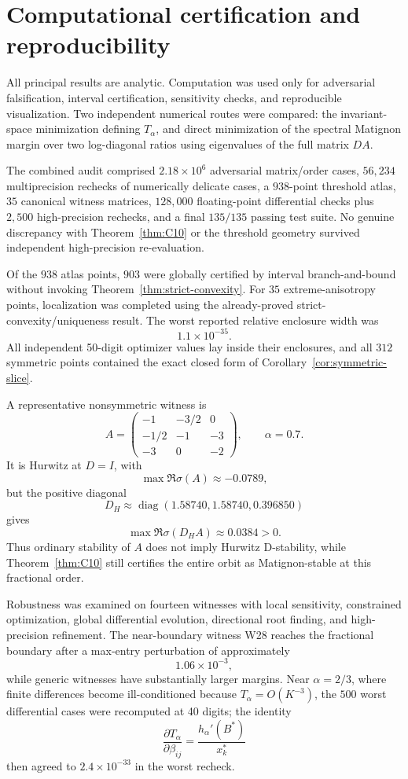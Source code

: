 \section{Computational certification and reproducibility}
\label{sec:computation}

All principal results are analytic. Computation was used only for adversarial falsification, interval certification, sensitivity checks, and reproducible visualization. Two independent numerical routes were compared: the invariant-space minimization defining \(T_\alpha\), and direct minimization of the spectral Matignon margin over two log-diagonal ratios using eigenvalues of the full matrix \(DA\).

The combined audit comprised \(2.18\times10^6\) adversarial matrix/order cases, \(56{,}234\) multiprecision rechecks of numerically delicate cases, a \(938\)-point threshold atlas, \(35\) canonical witness matrices, \(128{,}000\) floating-point differential checks plus \(2{,}500\) high-precision rechecks, and a final \(135/135\) passing test suite. No genuine discrepancy with Theorem~\ref{thm:C10} or the threshold geometry survived independent high-precision re-evaluation.

Of the \(938\) atlas points, \(903\) were globally certified by interval branch-and-bound without invoking Theorem~\ref{thm:strict-convexity}. For \(35\) extreme-anisotropy points, localization was completed using the already-proved strict-convexity/uniqueness result. The worst reported relative enclosure width was
\[
1.1\times10^{-35}.
\]
All independent 50-digit optimizer values lay inside their enclosures, and all \(312\) symmetric points contained the exact closed form of Corollary~\ref{cor:symmetric-slice}.

A representative nonsymmetric witness is
\[
A=
\begin{pmatrix}
-1&-3/2&0\\
-1/2&-1&-3\\
-3&0&-2
\end{pmatrix},
\qquad \alpha=0.7.
\]
It is Hurwitz at \(D=I\), with
\[
\max\Re\sigma(A)\approx-0.0789,
\]
but the positive diagonal
\[
D_H\approx\operatorname{diag}(1.58740,1.58740,0.396850)
\]
gives
\[
\max\Re\sigma(D_HA)\approx0.0384>0.
\]
Thus ordinary stability of \(A\) does not imply Hurwitz D-stability, while Theorem~\ref{thm:C10} still certifies the entire orbit as Matignon-stable at this fractional order.

Robustness was examined on fourteen witnesses with local sensitivity, constrained optimization, global differential evolution, directional root finding, and high-precision refinement. The near-boundary witness W28 reaches the fractional boundary after a max-entry perturbation of approximately
\[
1.06\times10^{-3},
\]
while generic witnesses have substantially larger margins. Near \(\alpha=2/3\), where finite differences become ill-conditioned because \(T_\alpha=O(K^{-3})\), the \(500\) worst differential cases were recomputed at 40 digits; the identity
\[
\frac{\partial T_\alpha}{\partial\beta_{ij}}
=
\frac{h_\alpha'(B^*)}{x_k^*}
\]
then agreed to \(2.4\times10^{-33}\) in the worst recheck.

